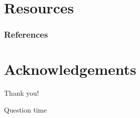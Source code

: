 \documentclass[10pt]{beamer}
\begin{document}
\section*{Resources}  
\begin{frame}[allowframebreaks]
        \frametitle{References}
        
        
\end{frame}

\section*{Acknowledgements}  
\begin{frame}
    \textcolor{myNewColorA}{\huge{\centerline{Thank you!}}}
    \vspace*{0.5cm}

\textcolor{myNewColorA}{\Large{\centerline{Question time}}}

\end{frame}
\end{document}
